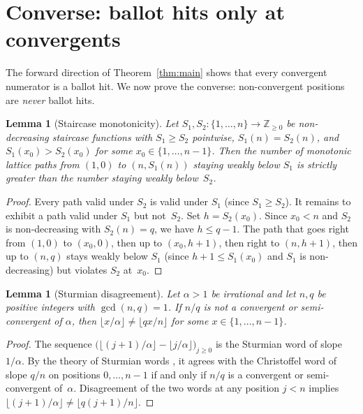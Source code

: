 \documentclass[11pt]{article}
\newtheorem{lemma}[theorem]{Lemma}
\theoremstyle{definition}
\theoremstyle{remark}
\newcommand{\floor}[1]{\lfloor #1 \rfloor}
\begin{document}
\section{Converse: ballot hits only at convergents}\label{sec:converse}

The forward direction of Theorem~\ref{thm:main} shows that every convergent numerator is a ballot hit.
We now prove the converse: non-convergent positions are \emph{never} ballot hits.

\begin{lemma}[Staircase monotonicity]\label{lem:mono}
Let $S_1, S_2\colon \{1, \ldots, n\} \to \mathbb{Z}_{\geq 0}$ be non-decreasing staircase functions with $S_1 \geq S_2$ pointwise, $S_1(n) = S_2(n)$, and $S_1(x_0) > S_2(x_0)$ for some $x_0 \in \{1, \ldots, n-1\}$.
Then the number of monotonic lattice paths from $(1,0)$ to $(n, S_1(n))$ staying weakly below $S_1$ is strictly greater than the number staying weakly below~$S_2$.
\end{lemma}

\begin{proof}
Every path valid under $S_2$ is valid under $S_1$ (since $S_1 \geq S_2$).
It remains to exhibit a path valid under $S_1$ but not~$S_2$.
Set $h = S_2(x_0)$.
Since $x_0 < n$ and $S_2$ is non-decreasing with $S_2(n) = q$, we have $h \leq q - 1$.
The path that goes right from $(1,0)$ to $(x_0, 0)$, then up to $(x_0, h+1)$, then right to $(n, h+1)$, then up to $(n, q)$ stays weakly below $S_1$ (since $h + 1 \leq S_1(x_0)$ and $S_1$ is non-decreasing) but violates $S_2$ at~$x_0$.
\end{proof}

\begin{lemma}[Sturmian disagreement]\label{lem:sturmian}
Let $\alpha > 1$ be irrational and let $n, q$ be positive integers with $\gcd(n, q) = 1$.
If $n/q$ is not a convergent or semi-convergent of $\alpha$, then $\floor{x/\alpha} \neq \floor{qx/n}$ for some $x \in \{1, \ldots, n-1\}$.
\end{lemma}

\begin{proof}
The sequence $\bigl(\floor{(j+1)/\alpha} - \floor{j/\alpha}\bigr)_{j \geq 0}$ is the Sturmian word of slope $1/\alpha$.
By the theory of Sturmian words \cite[Ch.~2]{Lothaire2002}, it agrees with the Christoffel word of slope $q/n$ on positions $0, \ldots, n-1$ if and only if $n/q$ is a convergent or semi-convergent of~$\alpha$.
Disagreement of the two words at any position $j < n$ implies $\floor{(j{+}1)/\alpha} \neq \floor{q(j{+}1)/n}$.
\end{proof}
\end{document}

